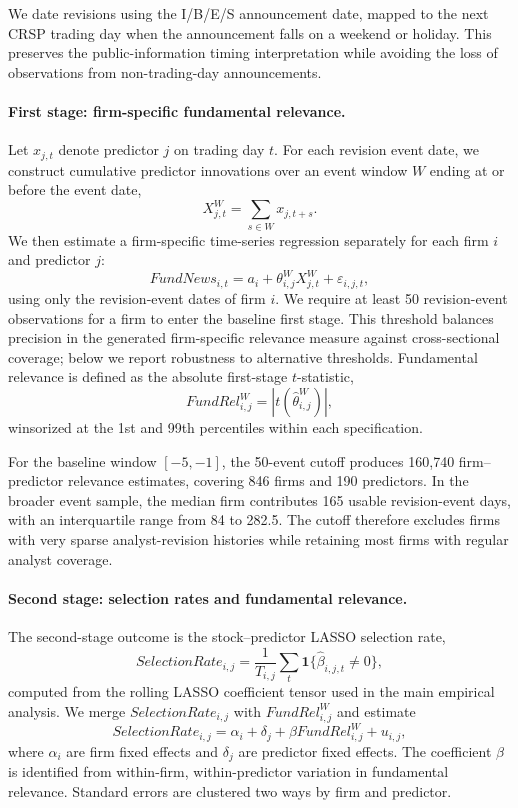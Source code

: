 We date revisions using the I/B/E/S announcement date, mapped to the next CRSP trading day when the announcement falls on a weekend or holiday. This preserves the public-information timing interpretation while avoiding the loss of observations from non-trading-day announcements.

\paragraph{First stage: firm-specific fundamental relevance.}

Let $x_{j,t}$ denote predictor $j$ on trading day $t$. For each revision event date, we construct cumulative predictor innovations over an event window $W$ ending at or before the event date,
\[
X^W_{j,t}=\sum_{s\in W}x_{j,t+s}.
\]
We then estimate a firm-specific time-series regression separately for each firm $i$ and predictor $j$:
\[
FundNews_{i,t}
=a_i+\theta_{i,j}^{W}X^W_{j,t}+\varepsilon_{i,j,t},
\]
using only the revision-event dates of firm $i$. We require at least 50 revision-event observations for a firm to enter the baseline first stage. This threshold balances precision in the generated firm-specific relevance measure against cross-sectional coverage; below we report robustness to alternative thresholds. Fundamental relevance is defined as the absolute first-stage $t$-statistic,
\[
FundRel^W_{i,j}=|t(\hat\theta^W_{i,j})|,
\]
winsorized at the 1st and 99th percentiles within each specification.

For the baseline window $[-5,-1]$, the 50-event cutoff produces 160{,}740 firm--predictor relevance estimates, covering 846 firms and 190 predictors. In the broader event sample, the median firm contributes 165 usable revision-event days, with an interquartile range from 84 to 282.5. The cutoff therefore excludes firms with very sparse analyst-revision histories while retaining most firms with regular analyst coverage.

\paragraph{Second stage: selection rates and fundamental relevance.}

The second-stage outcome is the stock--predictor LASSO selection rate,
\[
SelectionRate_{i,j}
=\frac{1}{T_{i,j}}\sum_t \mathbf{1}\{\hat\beta_{i,j,t}\neq 0\},
\]
computed from the rolling LASSO coefficient tensor used in the main empirical analysis. We merge $SelectionRate_{i,j}$ with $FundRel^W_{i,j}$ and estimate
\[
SelectionRate_{i,j}
=\alpha_i+\delta_j+\beta FundRel^W_{i,j}+u_{i,j},
\]
where $\alpha_i$ are firm fixed effects and $\delta_j$ are predictor fixed effects. The coefficient $\beta$ is identified from within-firm, within-predictor variation in fundamental relevance. Standard errors are clustered two ways by firm and predictor.

